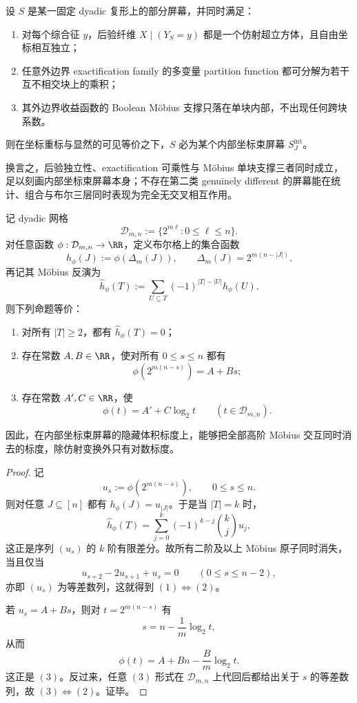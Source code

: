 \begin{conjecture}[完全因子化屏幕的刚性]\label{conj:conclusion-coordinate-bundle-complete-factorization-rigidity}
设 \(S\) 是某一固定 dyadic 复形上的部分屏幕，并同时满足：
\begin{enumerate}
  \item 对每个综合征 \(y\)，后验纤维 \(X\mid (Y_S=y)\) 都是一个仿射超立方体，且自由坐标相互独立；
  \item 任意外边界 exactification family 的多变量 partition function 都可分解为若干互不相交块上的乘积；
  \item 其外边界收益函数的 Boolean Möbius 支撑只落在单块内部，不出现任何跨块系数。
\end{enumerate}
则在坐标重标与显然的可见等价之下，\(S\) 必为某个内部坐标束屏幕 \(S_J^{\mathrm{int}}\)。

换言之，后验独立性、exactification 可乘性与 Möbius 单块支撑三者同时成立，足以刻画内部坐标束屏幕本身；不存在第二类 genuinely different 的屏幕能在统计、组合与布尔三层同时表现为完全无交叉相互作用。
\end{conjecture}

\begin{theorem}[对数标度的唯一无交互性]\label{thm:conclusion-coordinate-bundle-logscale-unique-nointeraction}
记 dyadic 网格
\[
\mathcal D_{m,n}:=\{2^{m\ell}:0\le \ell\le n\}.
\]
对任意函数 \(\phi:\mathcal D_{m,n}\to\RR\)，定义布尔格上的集合函数
\[
h_\phi(J):=\phi(\Delta_m(J)),
\qquad
\Delta_m(J)=2^{m(n-|J|)}.
\]
再记其 Möbius 反演为
\[
\widehat h_\phi(T)
:=
\sum_{U\subseteq T}(-1)^{|T|-|U|}h_\phi(U).
\]
则下列命题等价：
\begin{enumerate}
  \item 对所有 \(|T|\ge 2\)，都有 \(\widehat h_\phi(T)=0\)；
  \item 存在常数 \(A,B\in\RR\)，使对所有 \(0\le s\le n\) 都有
  \[
  \phi(2^{m(n-s)})=A+Bs;
  \]
  \item 存在常数 \(A',C\in\RR\)，使
  \[
  \phi(t)=A'+C\log_2 t
  \qquad
  (t\in \mathcal D_{m,n}).
  \]
\end{enumerate}
因此，在内部坐标束屏幕的隐藏体积标度上，能够把全部高阶 Möbius 交互同时消去的标度，除仿射变换外只有对数标度。
\end{theorem}
\begin{proof}
记
\[
u_s:=\phi(2^{m(n-s)}),
\qquad
0\le s\le n.
\]
则对任意 \(J\subseteq [n]\) 都有 \(h_\phi(J)=u_{|J|}\)。于是当 \(|T|=k\) 时，
\[
\widehat h_\phi(T)
=
\sum_{j=0}^{k}(-1)^{k-j}\binom{k}{j}u_j,
\]
这正是序列 \((u_s)\) 的 \(k\) 阶有限差分。故所有二阶及以上 Möbius 原子同时消失，当且仅当
\[
u_{s+2}-2u_{s+1}+u_s=0
\qquad
(0\le s\le n-2),
\]
亦即 \((u_s)\) 为等差数列，这就得到 \((1)\Longleftrightarrow(2)\)。

若 \(u_s=A+Bs\)，则对 \(t=2^{m(n-s)}\) 有
\[
s=n-\frac{1}{m}\log_2 t,
\]
从而
\[
\phi(t)=A+Bn-\frac{B}{m}\log_2 t.
\]
这正是 \((3)\)。反过来，任意 \((3)\) 形式在 \(\mathcal D_{m,n}\) 上代回后都给出关于 \(s\) 的等差数列，故 \((3)\Longleftrightarrow(2)\)。证毕。
\end{proof}

